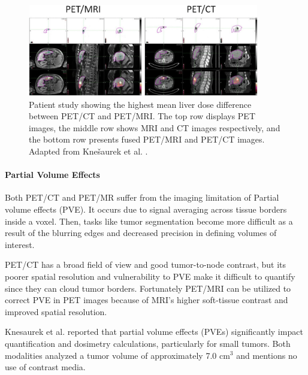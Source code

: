 \begin{figure}[ht]
	\centering
	\includegraphics[width=0.9\textwidth]{assets/Liver_Dosimetry_Differences.png} 
	\caption{Patient study showing the highest mean liver dose difference between PET/CT and PET/MRI. The top row displays PET images, the middle row shows MRI and CT images respectively, and the bottom row presents fused PET/MRI and PET/CT images. Adapted from Knešaurek et al. \cite{knesaurek2018}.}
	\label{fig:patient_liver_dose}
\end{figure}

\paragraph{Partial Volume Effects}

Both PET/CT and PET/MR suffer from the imaging limitation of Partial volume effects (PVE). It occurs due to signal averaging across tissue borders inside a voxel. Then, tasks like tumor segmentation become more difficult as a result of the blurring edges and decreased precision in defining volumes of interest. 

PET/CT has a broad field of view and good tumor-to-node contrast, but its poorer spatial resolution and vulnerability to PVE make it difficult to quantify since they can cloud tumor borders. Fortunately PET/MRI can be utilized to correct PVE in PET images because of MRI's higher soft-tissue contrast and improved spatial resolution. 

Knesaurek et al. \cite{knesaurek2018} reported that partial volume effects (PVEs) significantly impact quantification and dosimetry calculations, particularly for small tumors. Both modalities analyzed a tumor volume of approximately 7.0 $\text{cm}^3$ and mentions no use of contrast media. 


